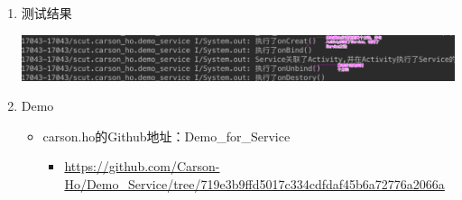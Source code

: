 \documentclass[9pt, b5paper]{article}
\begin{document}
\begin{enumerate}
\item 测试结果
\label{sec-3-4-2-2}

\includegraphics[width=.9\linewidth]{./pic/log2.png}
\item Demo
\label{sec-3-4-2-3}
\begin{itemize}
\item carson.ho的Github地址：Demo\_for\_Service
\begin{itemize}
\item \url{https://github.com/Carson-Ho/Demo_Service/tree/719e3b9ffd5017c334cdfdaf45b6a72776a2066a}
\end{itemize}
\end{itemize}
\end{enumerate}
\end{document}
